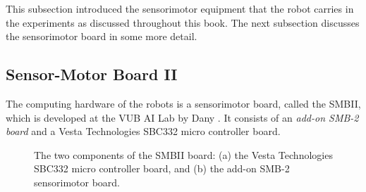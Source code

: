 \bigskip\noindent
This subsection introduced the sensorimotor equipment that the robot carries in the experiments as discussed throughout this book. The next subsection discusses the sensorimotor board in some more detail.

\subsection{Sensor-Motor Board II}\label{setup:smbii}


The computing hardware of the robots is a sensorimotor board, called the SMBII, which is developed at the VUB AI Lab by Dany \citet{vereertbrugghen:1996}. It consists of an {\em add-on SMB-2 board} and a Vesta Technologies SBC332 micro controller board.

\begin{figure}
\centering
{}
\caption{The two components of the SMBII board: (a) the Vesta Technologies SBC332 micro controller board, and (b) the add-on SMB-2 sensorimotor board.}
\end{figure}

